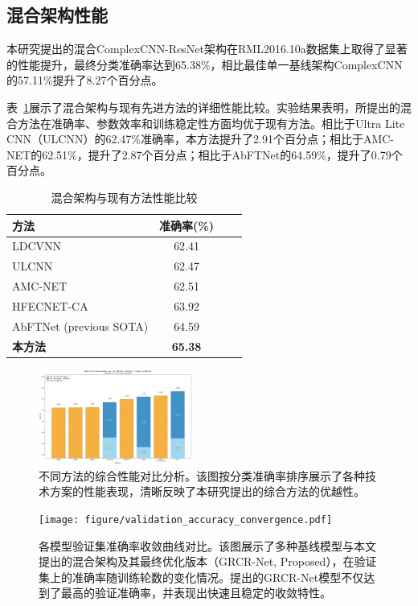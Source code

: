 \documentclass[conference]{IEEEtran}
\begin{document}
\subsection{混合架构性能}

本研究提出的混合ComplexCNN-ResNet架构在RML2016.10a数据集上取得了显著的性能提升，最终分类准确率达到65.38\%，相比最佳单一基线架构ComplexCNN的57.11\%提升了8.27个百分点。

表~\ref{tab:hybrid_performance}展示了混合架构与现有先进方法的详细性能比较。实验结果表明，所提出的混合方法在准确率、参数效率和训练稳定性方面均优于现有方法。相比于Ultra Lite CNN（ULCNN）的62.47\%准确率，本方法提升了2.91个百分点；相比于AMC-NET的62.51\%，提升了2.87个百分点；相比于AbFTNet的64.59\%，提升了0.79个百分点。

\begin{table}[h]
\centering
\caption{混合架构与现有方法性能比较}
\label{tab:hybrid_performance}
\begin{tabular}{@{}lccc@{}}
\toprule
方法 & 准确率(\%) \\
\midrule
LDCVNN & 62.41 \\
ULCNN & 62.47 \\
AMC-NET & 62.51 \\
HFECNET-CA & 63.92 \\
AbFTNet (previous SOTA) & 64.59 \\
\textbf{本方法} & \textbf{65.38} \\
\bottomrule
\end{tabular}
\end{table}


\begin{figure}[htbp]
\centering
\includegraphics[width=0.45\textwidth]{figure/sorted_stacked_comparison.png}
\caption{不同方法的综合性能对比分析。该图按分类准确率排序展示了各种技术方案的性能表现，清晰反映了本研究提出的综合方法的优越性。}
\label{fig:method_comparison}
\end{figure}

\begin{figure}[htbp]
\centering
\texttt{[image: figure/validation\_accuracy\_convergence.pdf]}
\caption{各模型验证集准确率收敛曲线对比。该图展示了多种基线模型与本文提出的混合架构及其最终优化版本（GRCR-Net, Proposed），在验证集上的准确率随训练轮数的变化情况。提出的GRCR-Net模型不仅达到了最高的验证准确率，并表现出快速且稳定的收敛特性。}
\label{fig:training_convergence}
\end{figure}
\end{document}

